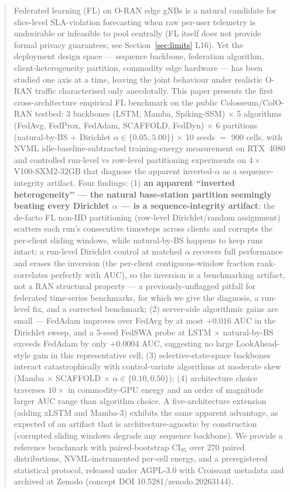 \documentclass[journal]{IEEEtran}
\begin{document}
\begin{abstract}
Federated learning (FL) on O-RAN edge gNBs is a natural candidate for slice-level SLA-violation forecasting when raw per-user telemetry is undesirable or infeasible to pool centrally (FL itself does not provide formal privacy guarantees; see Section~\ref{sec:limits} L16). Yet the deployment design space --- sequence backbone, federation algorithm, client-heterogeneity partition, commodity edge hardware --- has been studied one axis at a time, leaving the joint behaviour under realistic O-RAN traffic characterised only anecdotally. This paper presents the first cross-architecture empirical FL benchmark on the public Colosseum/ColO-RAN testbed: 3 backbones (LSTM, Mamba, Spiking-SSM) $\times$ 5 algorithms (FedAvg, FedProx, FedAdam, SCAFFOLD, FedDyn) $\times$ 6 partitions (natural-by-BS $+$ Dirichlet $\alpha \in \{0.05..5.00\}$) $\times$ 10 seeds $=$ 900 cells, with NVML idle-baseline-subtracted training-energy measurement on RTX~4080 and controlled run-level vs row-level partitioning experiments on $4\times$ V100-SXM2-32GB that diagnose the apparent inverted-$\alpha$ as a sequence-integrity artifact. Four findings: (1) \textbf{an apparent ``inverted heterogeneity'' --- the natural base-station partition seemingly beating every Dirichlet $\alpha$ --- is a sequence-integrity artifact}: the de-facto FL non-IID partitioning (row-level Dirichlet/random assignment) scatters each run's consecutive timesteps across clients and corrupts the per-client sliding windows, while natural-by-BS happens to keep runs intact; a run-level Dirichlet control at matched $\alpha$ recovers full performance and erases the inversion (the per-client contiguous-window fraction rank-correlates perfectly with AUC), so the inversion is a benchmarking artifact, not a RAN structural property --- a previously-unflagged pitfall for federated time-series benchmarks, for which we give the diagnosis, a run-level fix, and a corrected benchmark; (2) server-side algorithmic gains are small --- FedAdam improves over FedAvg by at most $+0.016$ AUC in the Dirichlet sweep, and a 5-seed FedSWA probe at LSTM $\times$ natural-by-BS exceeds FedAdam by only $+0.0004$ AUC, suggesting no large LookAhead-style gain in this representative cell; (3) selective-state-space backbones interact catastrophically with control-variate algorithms at moderate skew (Mamba $\times$ SCAFFOLD $\times$ $\alpha \in \{0.10, 0.50\}$); (4) architecture choice traverses $10\times$ in commodity-GPU energy and an order of magnitude larger AUC range than algorithm choice. A five-architecture extension (adding xLSTM and Mamba-3) exhibits the same apparent advantage, as expected of an artifact that is architecture-agnostic by construction (corrupted sliding windows degrade any sequence backbone). We provide a reference benchmark with paired-bootstrap CI$_{95}$ over 270 paired distributions, NVML-instrumented per-cell energy, and a preregistered statistical protocol, released under AGPL-3.0 with Croissant metadata and archived at Zenodo (concept DOI 10.5281/zenodo.20263144).
\end{abstract}
\end{document}
